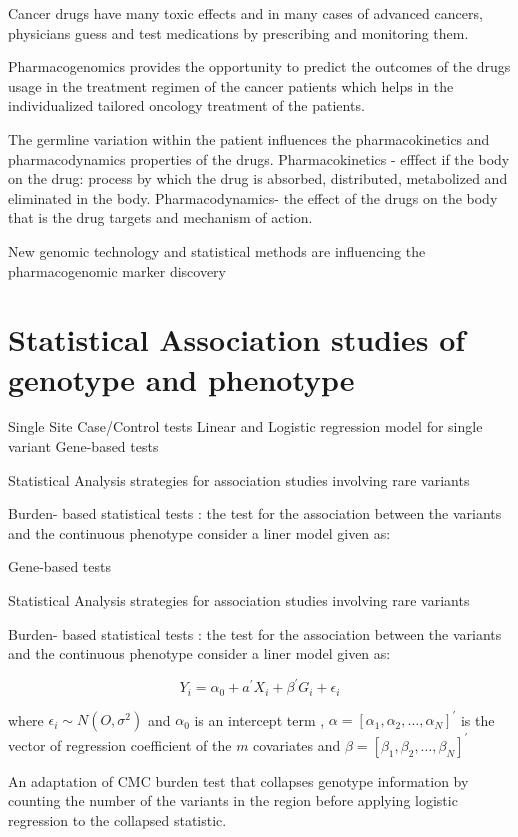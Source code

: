 Cancer drugs have many toxic effects and in many cases of advanced cancers, physicians guess and test medications by prescribing and monitoring them.

Pharmacogenomics provides the opportunity to predict the outcomes of the drugs usage in the treatment regimen of the cancer patients which helps in the individualized tailored oncology treatment of the patients.

The germline variation within the patient influences the pharmacokinetics and pharmacodynamics properties of the drugs. Pharmacokinetics - efffect if the body on the drug: process by which the drug is absorbed, distributed, metabolized and eliminated in the body. Pharmacodynamics- the effect of the drugs on the body that is the drug targets and mechanism of action.

New genomic technology and statistical methods are influencing the pharmacogenomic marker discovery

 
\section{Statistical Association studies of genotype and phenotype}

Single Site Case/Control tests
Linear and Logistic regression model for single variant
Gene-based tests 


Statistical Analysis strategies for association studies involving rare variants



Burden- based statistical tests : the test for the association between the variants and the continuous phenotype  consider a liner model given as:

Gene-based tests 


Statistical Analysis strategies for association studies involving rare variants



Burden- based statistical tests : the test for the association between the variants and the continuous phenotype  consider a liner model given as:

 \begin{equation*}
  Y_i = \alpha_0+ {a}^{'} X_i + {\beta}^{'} G_i+ {\epsilon}_{i}
  \end{equation*}
 
 where  
${\epsilon}_{i} \sim  N(O, {\sigma} ^2)$  and $\alpha_0$ is an intercept term , $\alpha = {[  {\alpha}_{1}, {\alpha}_{2},\dotsc,{\alpha}_{N} ]} ^ {'}$ is the vector of regression coefficient of the $m$ covariates and $\beta = [{\beta}_{1}, {\beta}_{2},\dotsc,{\beta}_{N}] ^{'}$

An adaptation of CMC burden test that collapses genotype information by counting the number of the variants in the region before applying logistic regression to the collapsed statistic.

 

  
